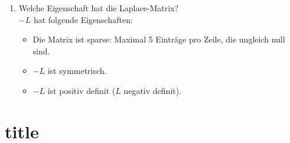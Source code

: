 \documentclass[10pt,a4paper,titlepage]{article}
\newcommand{\chf}{Cholesky-Faktorisierung\xspace}
\begin{document}
\begin{enumerate}[resume=b]
	\textbf{Dieses Gl ist mit der \chf lösbar. Die Zeitkomplexität ist allerdings mit $O(m^3)$ hoch in diesem Fall wodurch die lösungweise durch iterative lösungverfahren besser ist.}
	\item Welche Eigenschaft hat die Laplace-Matrix?\\
		$-L$ hat folgende Eigenschaften:
		\begin{itemize}
			\item Die Matrix ist sparse: Maximal 5 Einträge pro Zeile, die ungleich null sind.
			\item $-L$ ist symmetrisch.
			\item $-L$ ist positiv definit ($L$ negativ definit).
		\end{itemize}
\end{enumerate}
\section{title}
\end{document}
